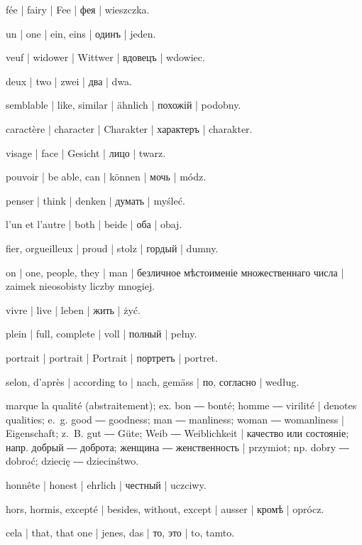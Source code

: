 \begin{ekzvocab}{1em}
 fée | fairy | Fee | фея | wieszczka.

 un | one | ein, eins | одинъ | jeden.

 veuf | widower | Wittwer | вдовецъ | wdowiec.

 deux | two | zwei | два | dwa.

 semblable | like, similar | ähnlich | похожій | podobny.

 caractère | character | Charakter | характеръ | charakter.

 visage | face | Gesicht | лицо | twarz.

 pouvoir | be able, can | können | мочь | módz.

 penser | think | denken | думать | myśleć.

 l’un et l’autre | both | beide | оба | obaj.

 fier, orgueilleux | proud | stolz | гордый | dumny.

 on | one, people, they | man | безличное мѣстоименіе множественнаго числа | zaimek nieosobisty liczby mnogiej.

 vivre | live | leben | жить | żyć.

 plein | full, complete | voll | полный | pełny.

 portrait | portrait | Portrait | портретъ | portret.

 selon, d’après | according to | nach, gemäss | по, согласно | według.

 marque la qualité (abstraitement); ex.  bon ―  bonté;  homme ―  virilité | denotes qualities; e.~g.  good ―  goodness;  man ―  manliness;  woman ―  womanliness | Eigenschaft; z.~B.  gut ―  Güte;  Weib ―  Weiblichkeit | качество или состояніе; напр.  добрый ―  доброта;  женщина ―  женственность | przymiot; np.  dobry ―  dobroć;  dziecię ―  dziecinśtwo.

 honnête | honest | ehrlich | честный | uczciwy.

 hors, hormis, excepté | besides, without, except | ausser | кромѣ | oprócz.

 cela | that, that one | jenes, das | то, это | to, tamto.

\end{ekzvocab}


